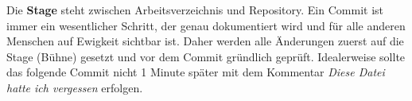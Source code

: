 \documentclass[11pt]{article}
\begin{document}
Die \textbf{Stage} steht zwischen Arbeitsverzeichnis und Repository.
Ein Commit ist immer ein wesentlicher Schritt, der genau dokumentiert
wird und für alle anderen Menschen auf Ewigkeit sichtbar ist. Daher
werden alle Änderungen zuerst auf die Stage (Bühne) gesetzt und vor
dem Commit gründlich geprüft. Idealerweise sollte das folgende Commit
nicht 1 Minute später mit dem Kommentar \textsl{Diese Datei hatte ich
  vergessen} erfolgen.
\end{document}
